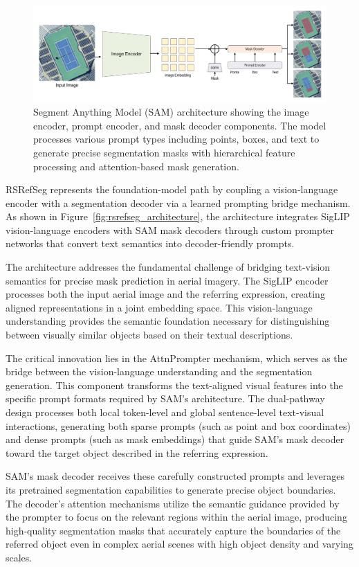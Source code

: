 \begin{figure}[htbp]
\centering
\includegraphics[width=1.0\textwidth]{Images/sam.png}
\caption{Segment Anything Model (SAM) architecture showing the image encoder, prompt encoder, and mask decoder components. The model processes various prompt types including points, boxes, and text to generate precise segmentation masks with hierarchical feature processing and attention-based mask generation.}
\label{fig:sam_architecture}
\end{figure}

RSRefSeg represents the foundation-model path by coupling a vision-language encoder with a segmentation decoder via a learned prompting bridge mechanism. As shown in Figure~\ref{fig:rsrefseg_architecture}, the architecture integrates SigLIP vision-language encoders with SAM mask decoders through custom prompter networks that convert text semantics into decoder-friendly prompts.

The architecture addresses the fundamental challenge of bridging text-vision semantics for precise mask prediction in aerial imagery. The SigLIP encoder processes both the input aerial image and the referring expression, creating aligned representations in a joint embedding space. This vision-language understanding provides the semantic foundation necessary for distinguishing between visually similar objects based on their textual descriptions.

The critical innovation lies in the AttnPrompter mechanism, which serves as the bridge between the vision-language understanding and the segmentation generation. This component transforms the text-aligned visual features into the specific prompt formats required by SAM's architecture. The dual-pathway design processes both local token-level and global sentence-level text-visual interactions, generating both sparse prompts (such as point and box coordinates) and dense prompts (such as mask embeddings) that guide SAM's mask decoder toward the target object described in the referring expression.

SAM's mask decoder receives these carefully constructed prompts and leverages its pretrained segmentation capabilities to generate precise object boundaries. The decoder's attention mechanisms utilize the semantic guidance provided by the prompter to focus on the relevant regions within the aerial image, producing high-quality segmentation masks that accurately capture the boundaries of the referred object even in complex aerial scenes with high object density and varying scales.

